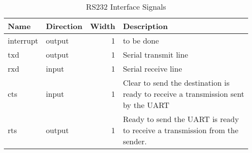 \begin{table}[H]
  \centering
  \begin{tabular}{|l|l|r|p{9.5cm}|}
    
    \hline
    \rowcolor{iob-green}
    {\bf Name} & {\bf Direction} & {\bf Width} & {\bf Description}  \\ \hline \hline

    interrupt & output & 1 & to be done \\ \hline
    \rowcolor{iob-blue}
    txd & output & 1 & Serial transmit line \\ \hline
    rxd & input & 1 & Serial receive line \\ \hline
    \rowcolor{iob-blue}
    cts & input & 1 & Clear to send the destination is ready to receive a transmission sent by the UART \\ \hline
    rts & output & 1 & Ready to send the UART is ready to receive a transmission from the sender. \\ \hline
 
  \end{tabular}
  \caption{RS232 Interface Signals}
  \label{rs232_is_tab:is}
\end{table}




